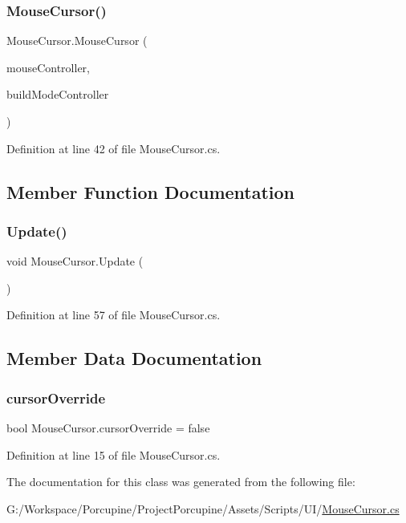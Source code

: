 \subsubsection{\texorpdfstring{Mouse\+Cursor()}{MouseCursor()}}
{\footnotesize\ttfamily Mouse\+Cursor.\+Mouse\+Cursor (\begin{DoxyParamCaption}\item[{\hyperlink{class_mouse_controller}{Mouse\+Controller}}]{mouse\+Controller,  }\item[{\hyperlink{class_build_mode_controller}{Build\+Mode\+Controller}}]{build\+Mode\+Controller }\end{DoxyParamCaption})}



Definition at line 42 of file Mouse\+Cursor.\+cs.



\subsection{Member Function Documentation}
\mbox{\label{class_mouse_cursor_a6a2ef153df0c5594f0c53794fd48432f}} 
\subsubsection{\texorpdfstring{Update()}{Update()}}
{\footnotesize\ttfamily void Mouse\+Cursor.\+Update (\begin{DoxyParamCaption}{ }\end{DoxyParamCaption})}



Definition at line 57 of file Mouse\+Cursor.\+cs.



\subsection{Member Data Documentation}
\mbox{\label{class_mouse_cursor_ae55c2e352643366bb71aa12bd73628c2}} 
\subsubsection{\texorpdfstring{cursor\+Override}{cursorOverride}}
{\footnotesize\ttfamily bool Mouse\+Cursor.\+cursor\+Override = false}



Definition at line 15 of file Mouse\+Cursor.\+cs.



The documentation for this class was generated from the following file\+:\begin{DoxyCompactItemize}
\item 
G\+:/\+Workspace/\+Porcupine/\+Project\+Porcupine/\+Assets/\+Scripts/\+U\+I/\hyperlink{_mouse_cursor_8cs}{Mouse\+Cursor.\+cs}\end{DoxyCompactItemize}
